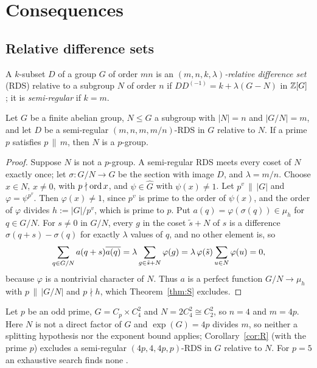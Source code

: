 \section{Consequences}\label{sec:cons}

\subsection{Relative difference sets}

A $k$-subset $D$ of a group $G$ of order $mn$ is an
\emph{$(m,n,k,\lambda)$-relative difference set} (RDS) relative to a
subgroup $N$ of order $n$ if $DD^{(-1)}=k+\lambda(G-N)$ in $\mathbb{Z}[G]$
\cite{Pott1995}; it is \emph{semi-regular} if $k=m$.

\begin{corollary}\label{cor:R}
Let $G$ be a finite abelian group, $N\le G$ a subgroup with $|N|=n$ and
$|G/N|=m$, and let $D$ be a semi-regular $(m,n,m,m/n)$-RDS in $G$
relative to $N$. If a prime $p$ satisfies $p\,\|\,m$, then $N$ is a
$p$-group. 
\end{corollary}

\begin{proof}
Suppose $N$ is not a $p$-group. A semi-regular RDS meets every coset of
$N$ exactly once; let $\sigma:G/N\to G$ be the section with image $D$, and
$\lambda=m/n$. Choose $x\in N$, $x\ne0$, with $p\nmid\operatorname{ord} x$, and
$\psi\in\widehat G$ with $\psi(x)\ne1$. Let $p^v\,\|\,|G|$ and
$\varphi=\psi^{p^v}$. Then $\varphi(x)\ne1$, since $p^v$ is prime to the
order of $\psi(x)$, and the order of $\varphi$ divides $h:=|G|/p^v$,
which is prime to $p$. Put $a(q)=\varphi(\sigma(q))\in\mu_h$ for $q\in
G/N$. For $s\ne0$ in $G/N$, every $g$ in the coset $\tilde s+N$ of $s$
is a difference $\sigma(q+s)-\sigma(q)$ for exactly $\lambda$ values of
$q$, and no other element is, so
\[
 \sum_{q\in G/N}a(q+s)\overline{a(q)}=\lambda\sum_{g\in\tilde s+N}\varphi(g)
 =\lambda\,\varphi(\tilde s)\sum_{u\in N}\varphi(u)=0 ,
\]
because $\varphi$ is a nontrivial character of $N$. Thus $a$ is a perfect
function $G/N\to\mu_h$ with $p\,\|\,|G/N|$ and $p\nmid h$, which
Theorem~\ref{thm:S} excludes.
\end{proof}

\begin{example}\label{ex:R}
Let $p$ be an odd prime, $G=C_p\times C_4^2$ and $N=2C_4^2\cong C_2^2$, so
$n=4$ and $m=4p$. Here $N$ is not a direct factor of $G$ and
$\exp(G)=4p$ divides $m$, so neither a splitting hypothesis nor the
exponent bound \cite[Thm.~4.1.1]{Pott1995} applies; Corollary~\ref{cor:R}
(with the prime $p$) excludes a semi-regular $(4p,4,4p,p)$-RDS in $G$
relative to $N$. For $p=5$ an exhaustive search finds none .
\end{example}

